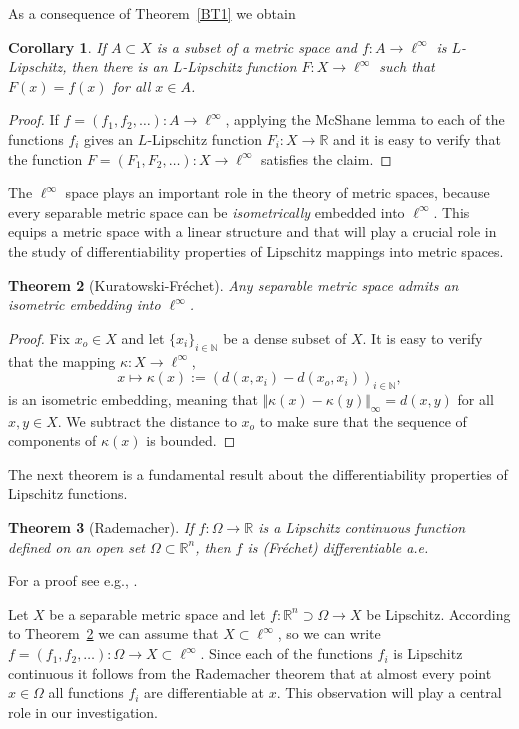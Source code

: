 \documentclass[12pt,leqno]{amsart}
\newtheorem{theorem}{Theorem}
\newtheorem{corollary}[theorem]{Corollary}
\theoremstyle{definition}
\newcommand{\bbbn}{\mathbb N}
\newcommand{\bbbr}{\mathbb R}
\numberwithin{theorem}{section} \numberwithin{equation}{section}
\begin{document}
As a consequence of Theorem~\ref{BT1} we obtain
\begin{corollary}
\label{BT2}
If $A\subset X$ is a subset of a metric space and $f:A\to \ell^\infty$ is $L$-Lipschitz, then there is an $L$-Lipschitz function $F:X\to\ell^\infty$ such that $F(x)=f(x)$ for all $x\in A$.
\end{corollary}
\begin{proof}
If $f=(f_1,f_2,\ldots):A\to\ell^\infty$, applying the McShane lemma to each of the functions $f_i$ gives an $L$-Lipschitz function $F_i:X\to\bbbr$ and it is easy to verify that the function $F=(F_1,F_2,\ldots):X\to\ell^\infty$ satisfies the claim.
\end{proof}

The $\ell^\infty$ space plays an important role in the theory of metric spaces, because every separable metric space can be {\em isometrically} embedded into $\ell^\infty$. This equips a metric space with a linear structure and that will play a crucial role in the study of differentiability properties of Lipschitz mappings into metric spaces.
\begin{theorem}[Kuratowski-Fr\'echet]
\label{BT3}
Any separable metric space admits an isometric embedding into $\ell^\infty$.
\end{theorem}
\begin{proof}
Fix $x_o\in X$ and let $\{x_i\}_{i\in\bbbn}$ be a dense subset of $X$. It is easy to verify that the mapping $\kappa\colon X\to\ell^\infty$,
$$
x\mapsto\kappa(x):=(d(x,x_i)-d(x_o,x_i))_{i\in\bbbn},
$$
is an isometric embedding, meaning that $\Vert\kappa(x)-\kappa(y)\Vert_\infty=d(x,y)$ for all $x,y\in X$. We subtract the distance to $x_o$ to make sure that the sequence of components of $\kappa(x)$ is bounded.
\end{proof}
The next theorem is a fundamental result about the differentiability properties of Lipschitz functions.
\begin{theorem}[Rademacher]
\label{BT4}
If $f:\Omega\to\bbbr$ is a Lipschitz continuous function defined on an open set $\Omega\subset\bbbr^n$, then $f$ is (Fr\'echet) differentiable a.e.
\end{theorem}
For a proof see e.g., \cite[Theorem~3.2]{evans}.

Let $X$ be a separable metric space and let $f:\bbbr^n\supset\Omega\to X$ be Lipschitz. According to Theorem~\ref{BT3} we can assume that $X\subset\ell^\infty$, so we can write
$f=(f_1,f_2,\ldots):\Omega\to X\subset \ell^\infty$. Since each of the functions $f_i$ is Lipschitz continuous it follows from the Rademacher theorem that at almost every point $x\in\Omega$ all functions $f_i$ are differentiable at $x$. This observation will play a central role in our investigation.
\end{document}

